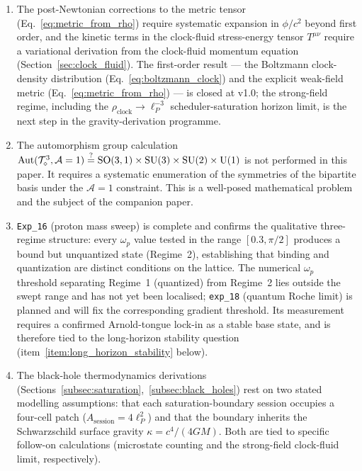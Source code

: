 \begin{enumerate}

\item The post-Newtonian corrections to the metric tensor
(Eq.~\ref{eq:metric_from_rho}) require systematic expansion in
$\phi/c^2$ beyond first order, and the kinetic terms in the
clock-fluid stress-energy tensor $T^{\mu\nu}$ require a variational
derivation from the clock-fluid momentum equation
(Section~\ref{sec:clock_fluid}).  The first-order result --- the
Boltzmann clock-density distribution (Eq.~\ref{eq:boltzmann_clock})
and the explicit weak-field metric (Eq.~\ref{eq:metric_from_rho}) ---
is closed at v1.0; the strong-field regime, including the
$\rho_\text{clock} \to \ell_P^{-3}$ scheduler-saturation horizon
limit, is the next step in the gravity-derivation programme.

\item The automorphism group calculation
$\mathrm{Aut}(\mathcal{T}_\diamond^3,\mathcal{A}=1) \stackrel{?}{=}
\mathrm{SO}(3,1)\times\mathrm{SU}(3)\times\mathrm{SU}(2)\times
\mathrm{U}(1)$ is not performed in this paper.
It requires a systematic enumeration of the symmetries of the
bipartite basis under the $\mathcal{A}=1$ constraint.
This is a well-posed mathematical problem and the subject of the
companion paper.

\item \texttt{Exp\_16} (proton mass sweep) is complete and confirms
the qualitative three-regime structure: every $\omega_p$ value tested
in the range $[0.3, \pi/2]$ produces a bound but unquantized state
(Regime~2), establishing that binding and quantization are distinct
conditions on the lattice.
The numerical $\omega_p$ threshold separating Regime~1 (quantized)
from Regime~2 lies outside the swept range and has not yet been
localised; \texttt{exp\_18} (quantum Roche limit) is planned and
will fix the corresponding gradient threshold.  Its measurement
requires a confirmed Arnold-tongue lock-in as a stable base state,
and is therefore tied to the long-horizon stability question
(item~\ref*{item:long_horizon_stability} below).

\item The black-hole thermodynamics derivations
(Sections~\ref{subsec:saturation},~\ref{subsec:black_holes}) rest on
two stated modelling assumptions: that each saturation-boundary
session occupies a four-cell patch
($A_\text{session} = 4\ell_P^2$) and that the boundary inherits the
Schwarzschild surface gravity $\kappa = c^4/(4GM)$.
Both are tied to specific follow-on calculations (microstate
counting and the strong-field clock-fluid limit, respectively).


\end{enumerate}
